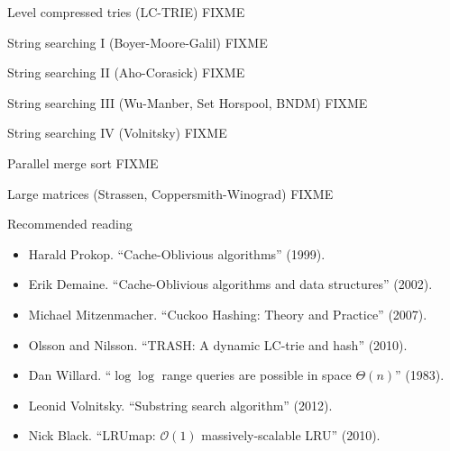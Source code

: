 \documentclass[mathserif,xcolor={dvipsnames,table}]{beamer}
\begin{document}
\begin{frame}{Level compressed tries (LC-TRIE)}
\huge FIXME
\end{frame}

\begin{frame}{String searching I (Boyer-Moore-Galil)}
\huge FIXME
\end{frame}

\begin{frame}{String searching II (Aho-Corasick)}
\huge FIXME
\end{frame}

\begin{frame}{String searching III (Wu-Manber, Set Horspool, BNDM)}
\huge FIXME
\end{frame}

\begin{frame}{String searching IV (Volnitsky)}
\huge FIXME
\end{frame}

\begin{frame}{Parallel merge sort}
\huge FIXME
\end{frame}

\begin{frame}{Large matrices (Strassen, Coppersmith-Winograd)}
\huge FIXME
\end{frame}

\begin{frame}{Recommended reading}
\footnotesize{
\begin{itemize}
\item Harald Prokop. ``Cache-Oblivious algorithms'' (1999).
\item Erik Demaine. ``Cache-Oblivious algorithms and data structures'' (2002).
\item Michael Mitzenmacher. ``Cuckoo Hashing: Theory and Practice'' (2007).
\item Olsson and Nilsson. ``TRASH: A dynamic LC-trie and hash'' (2010).
\item Dan Willard. ``$\log\log$ range queries are possible in space $\Theta(n)$'' (1983).
\item Leonid Volnitsky. ``Substring search algorithm'' (2012).
\item Nick Black. ``LRUmap: $\mathcal{O}(1)$ massively-scalable LRU'' (2010).
\end{itemize}
}
\end{frame}
\end{document}
